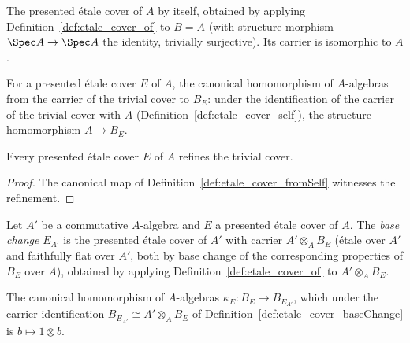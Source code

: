 \begin{definition}
  \label{def:etale_cover_self}
  \leanok
  The presented \'etale cover of \(A\) by itself, obtained by applying
  Definition~\ref{def:etale_cover_of} to \(B = A\) (with structure morphism \(\Spec A \to
  \Spec A\) the identity, trivially surjective). Its carrier is isomorphic to \(A\).
\end{definition}

\begin{definition}
  \label{def:etale_cover_fromSelf}
  \leanok
  For a presented \'etale cover \(E\) of \(A\), the canonical homomorphism of \(A\)-algebras
  from the carrier of the trivial cover to \(B_E\): under the identification of the carrier of
  the trivial cover with \(A\) (Definition~\ref{def:etale_cover_self}), the structure
  homomorphism \(A \to B_E\).
\end{definition}

\begin{lemma}
  \label{lem:etale_cover_refines_self}
  \leanok
  Every presented \'etale cover \(E\) of \(A\) refines the trivial cover.
\end{lemma}
\begin{proof}
  \leanok
  The canonical map of Definition~\ref{def:etale_cover_fromSelf} witnesses the refinement.
\end{proof}

\begin{definition}
  \label{def:etale_cover_baseChange}
  \leanok
  Let \(A'\) be a commutative \(A\)-algebra and \(E\) a presented \'etale cover of \(A\). The
  \emph{base change} \(E_{A'}\) is the presented \'etale cover of \(A'\) with carrier
  \(A' \otimes_A B_E\) (\'etale over \(A'\) and faithfully flat over \(A'\), both by base
  change of the corresponding properties of \(B_E\) over \(A\)), obtained by applying
  Definition~\ref{def:etale_cover_of} to \(A' \otimes_A B_E\).
\end{definition}

\begin{definition}
  \label{def:etale_cover_baseChangeInclude}
  \leanok
  The canonical homomorphism of \(A\)-algebras \(\kappa_E \colon B_E \to B_{E_{A'}}\), which
  under the carrier identification \(B_{E_{A'}} \cong A' \otimes_A B_E\) of
  Definition~\ref{def:etale_cover_baseChange} is \(b \mapsto 1 \otimes b\).
\end{definition}

